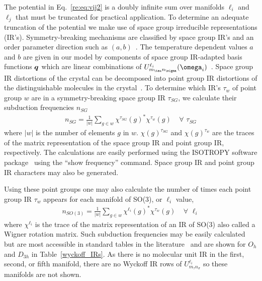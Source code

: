 \documentclass[preprint]{iucr}              %
\newcommand{\mb}[1]{\ensuremath{\mbox{\boldmath $ #1 $}}}
\begin{document}
The potential in Eq.~\ref{re:eq:vij2} is a doubly infinite sum over
manifolds $\ell_i$ and $\ell_j$ that must be truncated for practical
application. To determine an adequate truncation of the potential we
make use of space group irreducible representations (IR's).
Symmetry-breaking mechanisms are classified by space group IR's and
an order parameter direction such as $(a,b)$~\cite{Stokes02b}.  The
temperature dependent values $a$ and $b$ are given in our model by
components of space group IR-adapted basis functions $\mb{q}$ which
are linear combinations of $U^{\ell_i}_{m_\tau
n_\sigma}(\mb{\omega}_i)$~\cite{Mettes04}. Space group IR
distortions of the crystal can be decomposed into point group IR
distortions of the distinguishable molecules in the
crystal~\cite{Stokes91}. To determine which IR's $\tau_w$ of point
group $w$ are in a symmetry-breaking space group IR $\tau_{SG}$, we
calculate their subduction frequencies $n_{SG}$
\begin{eqnarray}
\label{subduction1} n_{SG}=\frac{1}{|w|}\sum_{g\in
w}\chi^{\tau_{SG}}(g)^*\chi^{\tau_w}(g)\;\;\;\;\forall\,\,\tau_{SG}
\end{eqnarray}
where $|w|$ is the number of elements $g$ in $w$.
$\chi(g)^{\tau_{SG}}$ and $\chi(g)^{\tau_w}$ are the traces of the
matrix representation of the space group IR and point group IR,
respectively. The calculations are easily performed using the
{I\small SOTROPY} software package~\cite{Stokes02b} using the ``show
frequency'' command. Space group IR and point group IR characters
may also be generated.

Using these point groups one may also calculate the number of times
each point group IR $\tau_w$ appears for each manifold of SO(3), or
$\ell_i$ value,
\begin{eqnarray}
\label{subduction2} n_{SO(3)}=\frac{1}{|w|}\sum_{g\in
w}\chi^{\ell_i}(g)^*\chi^{\tau_w}(g)\;\;\;\;\forall\,\,\ell_i
\end{eqnarray}
where $\chi^{\ell_i}$ is the trace of the matrix representation of
an IR of SO(3) also called a Wigner rotation matrix. Such subduction
frequencies may be easily calculated but are most accessible in
standard tables in the literature~\cite{Bradley72} and are shown for
$O_h$ and $D_{3h}$ in Table~\ref{wyckoff_IRs}.  As there is no
molecular unit IR in the first, second, or fifth manifold, there are
no Wyckoff IR rows of $U^{\ell_i}_{m_\tau n_\sigma}$ so these
manifolds are not shown.
\end{document}
